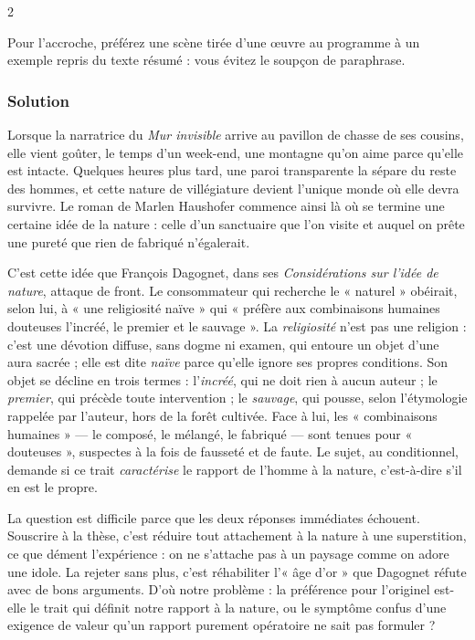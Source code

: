 \documentclass[11pt,a4paper]{article}
\begin{document}
\begin{indication}{2}

Pour l'accroche, préférez une scène tirée d'une œuvre au programme à un exemple repris du texte résumé : vous évitez le soupçon de paraphrase.

\end{indication}

\hypertarget{solution-6}{%
\subsubsection{Solution}\label{solution-6}}

Lorsque la narratrice du \emph{Mur invisible} arrive au pavillon de chasse de ses cousins, elle vient goûter, le temps d'un week-end, une montagne qu'on aime parce qu'elle est intacte. Quelques heures plus tard, une paroi transparente la sépare du reste des hommes, et cette nature de villégiature devient l'unique monde où elle devra survivre. Le roman de Marlen Haushofer commence ainsi là où se termine une certaine idée de la nature : celle d'un sanctuaire que l'on visite et auquel on prête une pureté que rien de fabriqué n'égalerait.

C'est cette idée que François Dagognet, dans ses \emph{Considérations sur l'idée de nature}, attaque de front. Le consommateur qui recherche le « naturel » obéirait, selon lui, à « une religiosité naïve » qui « préfère aux combinaisons humaines douteuses l'incréé, le premier et le sauvage ». La \emph{religiosité} n'est pas une religion : c'est une dévotion diffuse, sans dogme ni examen, qui entoure un objet d'une aura sacrée ; elle est dite \emph{naïve} parce qu'elle ignore ses propres conditions. Son objet se décline en trois termes : l'\emph{incréé}, qui ne doit rien à aucun auteur ; le \emph{premier}, qui précède toute intervention ; le \emph{sauvage}, qui pousse, selon l'étymologie rappelée par l'auteur, hors de la forêt cultivée. Face à lui, les « combinaisons humaines » --- le composé, le mélangé, le fabriqué --- sont tenues pour « douteuses », suspectes à la fois de fausseté et de faute. Le sujet, au conditionnel, demande si ce trait \emph{caractérise} le rapport de l'homme à la nature, c'est-à-dire s'il en est le propre.

La question est difficile parce que les deux réponses immédiates échouent. Souscrire à la thèse, c'est réduire tout attachement à la nature à une superstition, ce que dément l'expérience : on ne s'attache pas à un paysage comme on adore une idole. La rejeter sans plus, c'est réhabiliter l'« âge d'or » que Dagognet réfute avec de bons arguments. D'où notre problème : la préférence pour l'originel est-elle le trait qui définit notre rapport à la nature, ou le symptôme confus d'une exigence de valeur qu'un rapport purement opératoire ne sait pas formuler ?
\end{document}
